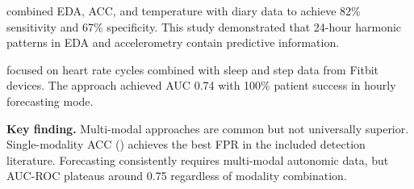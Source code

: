 \textcite{vielufSeizureMonitoringCombined2025} combined EDA, ACC, and temperature with diary data to achieve 82\% sensitivity and 67\% specificity. This study demonstrated that 24-hour harmonic patterns in EDA and accelerometry contain predictive information.

\textcite{stirlingForecastingSeizureLikelihood2021} focused on heart rate cycles combined with sleep and step data from Fitbit devices. The approach achieved AUC 0.74 with 100\% patient success in hourly forecasting mode.

\textbf{Key finding.} Multi-modal approaches are common but not universally superior. Single-modality ACC (\textcite{spahrDeepLearningbasedDetection2025}) achieves the best FPR in the included detection literature. Forecasting consistently requires multi-modal autonomic data, but AUC-ROC plateaus around 0.75 regardless of modality combination.
